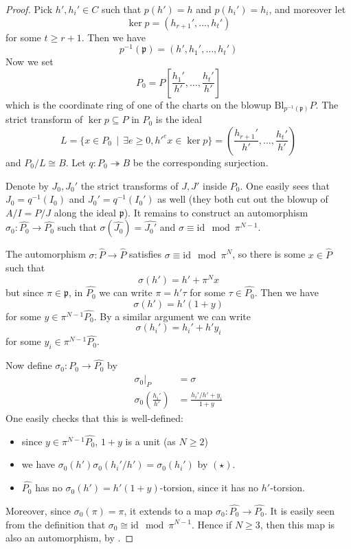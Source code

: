 \documentclass{article}
\theoremstyle{definition}
\theoremstyle{plain}
\theoremstyle{remark}
\newcommand{\bl}{\mathrm{Bl}}
\newcommand{\onto}{\twoheadrightarrow}
\newcommand{\id}{\mathrm{id}}
\newcommand{\comp}[1]{\widehat{#1}}
\begin{document}
\begin{proof}
		Pick $h', h_i'\in C$ such that $p(h') = h$ and $p(h_i') = h_i$, and moreover let 
		\[\ker p = (h_{r+1}', \ldots, h_t')\]
		for some $t\ge r+1$. Then we have
		\[p^{-1}(\mathfrak{p}) = (h', h_1', \ldots, h_t')\]
		Now we set
		\[P_0 = P\left[\frac{h_1'}{h'}, \ldots, \frac{h_t'}{h'}\right]\]
		which is the coordinate ring of one of the charts on the blowup $\bl_{p^{-1}(\mathfrak{p})} P$. The strict transform of $\ker p\subseteq P$ in $P_0$ is the ideal
		\[L = \{x\in P_0\,\mid\,\exists e\ge 0, h'^ex\in \ker p\} = \left(\frac{h_{r+1}'}{h'}, \ldots, \frac{h_t'}{h'}\right)\]
		and $P_0/L\cong B$. Let $q: P_0\onto B$ be the corresponding surjection.
		
		Denote by $J_0, J_0'$ the strict transforms of $J, J'$ inside $P_0$. One easily sees that $J_0 = q^{-1}(I_0)$ and $J_0' = q^{-1}(I_0')$ as well (they both cut out the blowup of $A/I = P/J$ along the ideal $\mathfrak{p}$). It remains to construct an automorphism $\sigma_0: \comp{P_0}\to \comp{P_0}$ such that $\sigma(\comp{J_0}) = \comp{J_0'}$ and $\sigma\equiv \id \mod \pi^{N-1}$.
		
		The automorphism $\sigma: \comp{P}\to \comp{P}$ satisfies $\sigma\equiv \id \mod \pi^N$, so there is some $x\in \comp{P}$ such that
		\[\sigma(h') = h' + \pi^Nx\]
		but since $\pi\in \mathfrak{p}$, in $\comp{P_0}$ we can write $\pi = h'\tau$ for some $\tau\in \comp{P_0}$. Then we have
		\[\sigma(h') = h'(1 + y)\]
		for some $y\in \pi^{N-1}\comp{P_0}$. By a similar argument we can write
		\[\sigma(h_i') = h_i' + h'y_i\tag{$\star$}\]
		for some $y_i\in \pi^{N-1}\comp{P_0}$.
		
		Now define $\sigma_0: P_0\to \comp{P_0}$ by
		\begin{align*}
			\sigma_0|_P &= \sigma\\
			\sigma_0\left(\frac{h_i'}{h'}\right) &= \frac{h_i'/h' + y_i}{1 + y}
		\end{align*}
		One easily checks that this is well-defined:
		\begin{itemize}
			\item since $y\in \pi^{N-1}\comp{P_0}$, $1+y$ is a unit (as $N\ge 2$)
			\item we have $\sigma_0(h')\sigma_0(h_i'/h') = \sigma_0(h_i')$ by $(\star)$.
			\item $\comp{P_0}$ has no $\sigma_0(h') = h'(1+y)$-torsion, since it has no $h'$-torsion.
		\end{itemize}
		Moreover, since $\sigma_0(\pi) = \pi$, it extends to a map $\sigma_0: \comp{P_0}\to \comp{P_0}$. It is easily seen from the definition that $\sigma_0\cong \id\mod \pi^{N-1}$. Hence if $N\ge 3$, then this map is also an automorphism, by \cite[Lemma 5.0]{Cutkosky_Srinivasan_1993}.
		

\end{proof}
\end{document}

